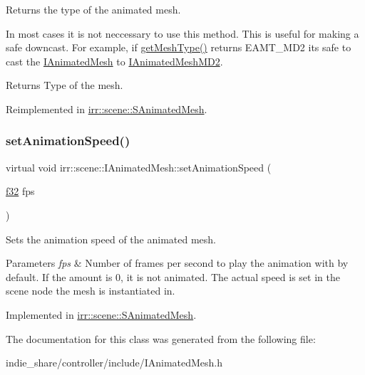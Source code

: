 Returns the type of the animated mesh. 

In most cases it is not neccessary to use this method. This is useful for making a safe downcast. For example, if \hyperlink{classirr_1_1scene_1_1IAnimatedMesh_abe5a20eccfb94eefcc6cbbc0b667ce37}{get\+Mesh\+Type()} returns E\+A\+M\+T\+\_\+\+M\+D2 it\textquotesingle{}s safe to cast the \hyperlink{classirr_1_1scene_1_1IAnimatedMesh}{I\+Animated\+Mesh} to \hyperlink{classirr_1_1scene_1_1IAnimatedMeshMD2}{I\+Animated\+Mesh\+M\+D2}. \begin{DoxyReturn}{Returns}
Type of the mesh. 
\end{DoxyReturn}


Reimplemented in \hyperlink{structirr_1_1scene_1_1SAnimatedMesh_a423a3a9a7d2075eac53280fdfb15fdc9}{irr\+::scene\+::\+S\+Animated\+Mesh}.

\mbox{\label{classirr_1_1scene_1_1IAnimatedMesh_a5eb1b09d96547dbd273d489e58d62658}} 
\subsubsection{\texorpdfstring{set\+Animation\+Speed()}{setAnimationSpeed()}}
{\footnotesize\ttfamily virtual void irr\+::scene\+::\+I\+Animated\+Mesh\+::set\+Animation\+Speed (\begin{DoxyParamCaption}\item[{\hyperlink{namespaceirr_a0277be98d67dc26ff93b1a6a1d086b07}{f32}}]{fps }\end{DoxyParamCaption})\hspace{0.3cm}{\ttfamily [pure virtual]}}



Sets the animation speed of the animated mesh. 


\begin{DoxyParams}{Parameters}
{\em fps} & Number of frames per second to play the animation with by default. If the amount is 0, it is not animated. The actual speed is set in the scene node the mesh is instantiated in. \\
\hline
\end{DoxyParams}


Implemented in \hyperlink{structirr_1_1scene_1_1SAnimatedMesh_ae7a32638fe5c59007d044bbc3c170108}{irr\+::scene\+::\+S\+Animated\+Mesh}.



The documentation for this class was generated from the following file\+:\begin{DoxyCompactItemize}
\item 
indie\+\_\+share/controller/include/I\+Animated\+Mesh.\+h\end{DoxyCompactItemize}
